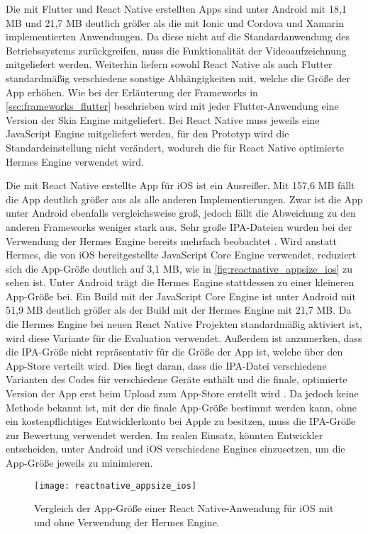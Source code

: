 Die mit Flutter und React Native erstellten Apps sind unter Android mit 18,1 MB und 21,7 MB deutlich größer als die mit Ionic und Cordova und Xamarin implementierten Anwendungen.
Da diese nicht auf die Standardanwendung des Betriebssystems zurückgreifen, muss die Funktionalität der Videoaufzeichnung mitgeliefert werden.
Weiterhin liefern sowohl React Native als auch Flutter standardmäßig verschiedene sonstige Abhängigkeiten mit, welche die Größe der App erhöhen.
Wie bei der Erläuterung der Frameworks in \autoref{sec:frameworks_flutter} beschrieben wird mit jeder Flutter-Anwendung eine Version der Skia Engine mitgeliefert.
Bei React Native muss jeweils eine JavaScript Engine mitgeliefert werden, für den Prototyp wird die Standardeinstellung nicht verändert, wodurch die für React Native optimierte Hermes Engine verwendet wird.

Die mit React Native erstellte App für iOS ist ein Ausreißer.
Mit 157,6 MB fällt die App deutlich größer aus als alle anderen Implementierungen.
Zwar ist die App unter Android ebenfalls vergleichsweise groß, jedoch fällt die Abweichung zu den anderen Frameworks weniger stark aus.
Sehr große \ac{IPA}-Dateien wurden bei der Verwendung der Hermes Engine bereits mehrfach beobachtet \cite{Hermes_appsize,Hermes_appsize_2}.
Wird anstatt Hermes, die von iOS bereitgestellte JavaScript Core Engine verwendet, reduziert sich die App-Größe deutlich auf 3,1 MB, wie in \autoref{fig:reactnative_appsize_ios} zu sehen ist.
Unter Android trägt die Hermes Engine stattdessen zu einer kleineren App-Größe bei.
Ein Build mit der JavaScript Core Engine ist unter Android mit 51,9 MB deutlich größer als der Build mit der Hermes Engine mit 21,7 MB.
Da die Hermes Engine bei neuen React Native Projekten standardmäßig aktiviert ist, wird diese Variante für die Evaluation verwendet.
Außerdem ist anzumerken, dass die \ac{IPA}-Größe nicht repräsentativ für die Größe der App ist, welche über den App-Store verteilt wird.
Dies liegt daran, dass die \ac{IPA}-Datei verschiedene Varianten des Codes für verschiedene Geräte enthält und die finale, optimierte Version der App erst beim Upload zum App-Store erstellt wird \cite{IPA_Size}.
Da jedoch keine Methode bekannt ist, mit der die finale App-Größe bestimmt werden kann, ohne ein kostenpflichtiges Entwicklerkonto bei Apple zu besitzen, muss die \ac{IPA}-Größe zur Bewertung verwendet werden.
Im realen Einsatz, könnten Entwickler entscheiden, unter Android und iOS verschiedene Engines einzusetzen, um die App-Größe jeweils zu minimieren.

\begin{figure}[ht]
  \centering 
  \texttt{[image: reactnative\_appsize\_ios]}
   \caption{Vergleich der App-Größe einer React Native-Anwendung für iOS mit und ohne Verwendung der Hermes Engine.}
  \label{fig:reactnative_appsize_ios}
\end{figure}


